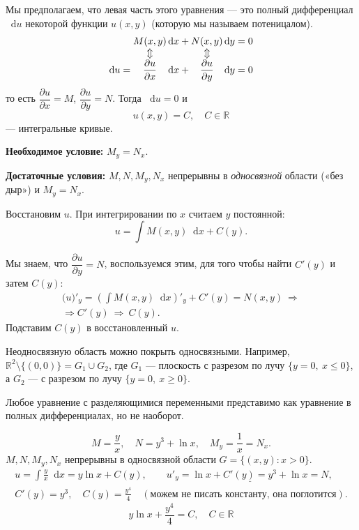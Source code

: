 \documentclass[12pt,a4paper]{article}
\numberwithin{equation}{section}
\newcommand{\R}{\mathbb{R}}
\newcommand{\dd}{\mathop{}\!\mathrm{d}}
\begin{document}
\label{box:type9}
\begin{definitionHSE}
Мы предполагаем, что левая часть этого уравнения — это полный дифференциал \(\dd u\) некоторой функции \(u(x,y)\) (которую мы называем потеницалом).
\[
\begin{array}{r@{}c@{}l@{}c@{}l}
          & M(x,y)                         & \,\dd x+{} & N(x,y)                         & \,\dd y=0\\
          & \Updownarrow                   &            & \Updownarrow                   &          \\
\dd u={}  & \dfrac{\partial u}{\partial x} & \,\dd x+{} & \dfrac{\partial u}{\partial y} & \,\dd y=0
\end{array}
\]
то есть $\dfrac{\partial u}{\partial x}=M$, $\dfrac{\partial u}{\partial y}=N$. Тогда $\dd u=0$ и
\[
\boxed{\ u(x,y)=C,\quad C\in\R\ }
\]
--- интегральные кривые.

\textbf{Необходимое условие:} $M_y=N_x$.

\textbf{Достаточные условия:} $M,N,M_y,N_x$ непрерывны в \emph{односвязной} области («без дыр») и $M_y=N_x$.

Восстановим $u$. При интегрировании по \(x\) считаем \(y\) постоянной:
\[u=\int M(x,y)\dd x+C(y).\]

Мы знаем, что \(\dfrac{\partial u}{\partial y}=N\), воспользуемся этим, для того чтобы найти \(C'(y)\) и затем \(C(y)\):
\begin{gather*}
\bigl(u\bigr)'_y=\left(\int M(x,y)\dd x\right)'_y+C'(y)=N(x,y)\ \Longrightarrow\\ \Longrightarrow C'(y)\ \Longrightarrow\ C(y).
\end{gather*}
Подставим \(C(y)\) в восстановленный \(u\).
\end{definitionHSE}

\begin{remarkHSE}
Неодносвязную область можно покрыть односвязными. Например, $\R^2\setminus\{(0,0)\}=G_1\cup G_2$, где $G_1$ --- плоскость с разрезом по лучу $\{y=0,\ x\le0\}$, а $G_2$ --- с разрезом по лучу $\{y=0,\ x\ge0\}$.
\end{remarkHSE}

\begin{remarkHSE}
Любое уравнение с разделяющимися переменными представимо как уравнение в полных дифференциалах, но не наоборот.
\end{remarkHSE}

\begin{exampleHSE}[\(\dfrac{y}{x}\dd x+(y^3+\ln x)\dd y=0\)]
\[
M=\frac yx,\quad N=y^3+\ln x,\quad M_y=\frac1x=N_x.
\]
$M,N,M_y,N_x$ непрерывны в односвязной области $G=\{(x,y):x>0\}$.
\begin{gather*}
u=\int\frac yx\dd x=y\ln x+C(y),\qquad
u'_y=\underline{\ln x+C'(y)=y^3+\ln x}=N,\\
C'(y)=y^3,\quad C(y)=\frac{y^4}{4}\quad(\text{можем не писать константу, она поглотится}).
\end{gather*}
\[
\boxed{\ y\ln x+\frac{y^4}{4}=C,\quad C\in\R\ }
\]
\end{exampleHSE}
\end{document}
